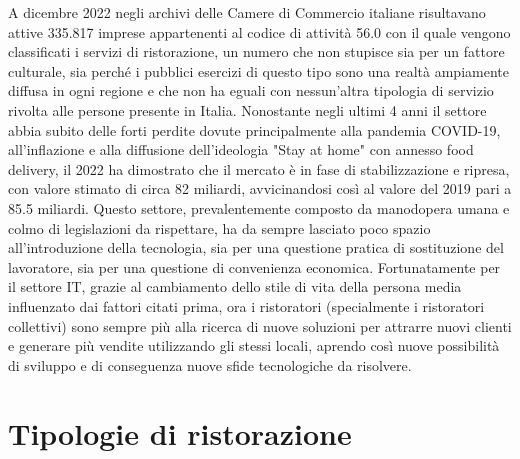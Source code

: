 \documentclass[a4paper, titlepage, 12pt, openright, twoside]{book}
\begin{document}
A dicembre 2022 negli archivi delle Camere di Commercio italiane risultavano attive 335.817 
imprese appartenenti al codice di attività 56.0 con il quale vengono classificati i servizi di ristorazione,
un numero che non stupisce sia per un fattore culturale, sia perché i pubblici esercizi di questo tipo sono
una realtà ampiamente diffusa in ogni regione e che non ha eguali con nessun'altra tipologia di servizio rivolta alle persone presente in Italia.
\newline
Nonostante negli ultimi 4 anni il settore abbia subito delle forti perdite dovute principalmente alla pandemia COVID-19,
all'inflazione e alla diffusione dell'ideologia "Stay at home" con annesso food delivery, 
il 2022 ha dimostrato che il mercato è in fase di stabilizzazione e ripresa, con valore stimato di circa 82 miliardi,
avvicinandosi così al valore del 2019 pari a 85.5 miliardi.
\newline
Questo settore, prevalentemente composto da manodopera umana e colmo di legislazioni da rispettare,
ha da sempre lasciato poco spazio all'introduzione della tecnologia, sia per una questione pratica di sostituzione del lavoratore,
sia per una questione di convenienza economica.
\newline
Fortunatamente per il settore IT, grazie al cambiamento dello stile di vita della persona media influenzato dai fattori citati prima,
ora i ristoratori (specialmente i ristoratori collettivi) sono sempre più alla ricerca di nuove soluzioni per attrarre nuovi clienti
e generare più vendite utilizzando gli stessi locali, aprendo così nuove possibilità di sviluppo e di conseguenza nuove sfide tecnologiche da risolvere.

\section{Tipologie di ristorazione}
\end{document}
